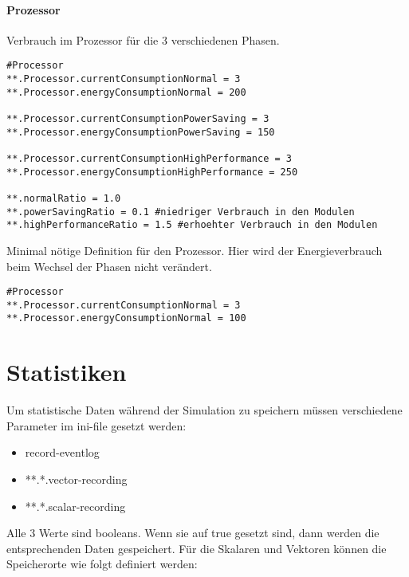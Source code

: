 \paragraph{Prozessor}
Verbrauch im Prozessor für die 3 verschiedenen Phasen.\\
\begin{minipage}{\textwidth}
\begin{lstlisting}
#Processor
**.Processor.currentConsumptionNormal = 3
**.Processor.energyConsumptionNormal = 200

**.Processor.currentConsumptionPowerSaving = 3
**.Processor.energyConsumptionPowerSaving = 150

**.Processor.currentConsumptionHighPerformance = 3
**.Processor.energyConsumptionHighPerformance = 250

**.normalRatio = 1.0
**.powerSavingRatio = 0.1 #niedriger Verbrauch in den Modulen
**.highPerformanceRatio = 1.5 #erhoehter Verbrauch in den Modulen
\end{lstlisting}
\end{minipage}

Minimal nötige Definition für den Prozessor. Hier wird der Energieverbrauch beim Wechsel der Phasen nicht verändert.\\
\begin{minipage}{\textwidth}
\begin{lstlisting}
#Processor
**.Processor.currentConsumptionNormal = 3
**.Processor.energyConsumptionNormal = 100
\end{lstlisting}
\end{minipage}

\section*{Statistiken}

Um statistische Daten während der Simulation zu speichern müssen verschiedene Parameter im ini-file gesetzt werden:

\begin{itemize}
\item record-eventlog
\item **.*.vector-recording
\item **.*.scalar-recording
\end{itemize}

Alle 3 Werte sind booleans. Wenn sie auf true gesetzt sind, dann werden die entsprechenden Daten gespeichert. Für die Skalaren und Vektoren können die Speicherorte wie folgt definiert werden:

